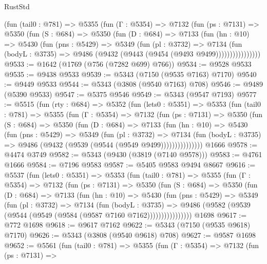 \begin{lexlean}{RustStd}
\begin{coremodule}
          (fun (tail0 : @781) =>
          @5355
            (fun (Γ : @5354) =>
            @7132
              (fun (ps : @7131) =>
              @5350
                (fun (S : @684) =>
                @5350
                  (fun (D : @684) =>
                  @7133
                    (fun (hn : @10) =>
                    @5430
                      (fun (pns : @5429) =>
                      @5349
                        (fun (pl : @3732) =>
                        @7134
                          (fun (bodyL : @3735) =>
                          @9486 (@9432 (@9443 (@9454 (@9493 @9499))))))))))))))))
@9533 := @1642 (@1769 (@756 (@7282 @699) @766))
@9534 := @9528 @9533
@9535 := @9438 @9533
@9539 := @5343 (@7150 (@9535 @7163) @7170)
@9540 := @9449 @9533
@9544 := @5343 (@3808 (@9540 @7163) @708)
@9546 := @9489 (@5390 @9533)
@9547 := @5375 @9546
@9549 := @5343 (@9547 @7193)
@9577 := @5515
    (fun (rty : @684) =>
    @5352
      (fun (lets0 : @5351) =>
      @5353
        (fun (tail0 : @781) =>
        @5355
          (fun (Γ : @5354) =>
          @7132
            (fun (ps : @7131) =>
            @5350
              (fun (S : @684) =>
              @5350
                (fun (D : @684) =>
                @7133
                  (fun (hn : @10) =>
                  @5430
                    (fun (pns : @5429) =>
                    @5349
                      (fun (pl : @3732) =>
                      @7134
                        (fun (bodyL : @3735) =>
                        @9486 (@9432 (@9539 (@9544 (@9549 @9499)))))))))))))))
    @1666
@9578 := @4474 @3749
@9582 := @5343 (@9430 (@3819 (@7140 @9578)))
@9583 := @4761 @1666
@9584 := @7196 @9583
@9587 := @5405 @9583 @9494 @8667
@9616 := @5537
    (fun (lets0 : @5351) =>
    @5353
      (fun (tail0 : @781) =>
      @5355
        (fun (Γ : @5354) =>
        @7132
          (fun (ps : @7131) =>
          @5350
            (fun (S : @684) =>
            @5350
              (fun (D : @684) =>
              @7133
                (fun (hn : @10) =>
                @5430
                  (fun (pns : @5429) =>
                  @5349
                    (fun (pl : @3732) =>
                    @7134
                      (fun (bodyL : @3735) =>
                      @9486 (@9582 (@9539 (@9544 (@9549 (@9584 (@9587 @7160 @7162))))))))))))))))
    @1698
@9617 := @772 @1698
@9618 := @9617 @7162
@9622 := @5343 (@7150 (@9535 @9618) @7170)
@9626 := @5343 (@3808 (@9540 @9618) @708)
@9627 := @9587 @1698
@9652 := @5561
    (fun (tail0 : @781) =>
    @5355
      (fun (Γ : @5354) =>
      @7132
        (fun (ps : @7131) =>

\end{coremodule}
\end{lexlean}
